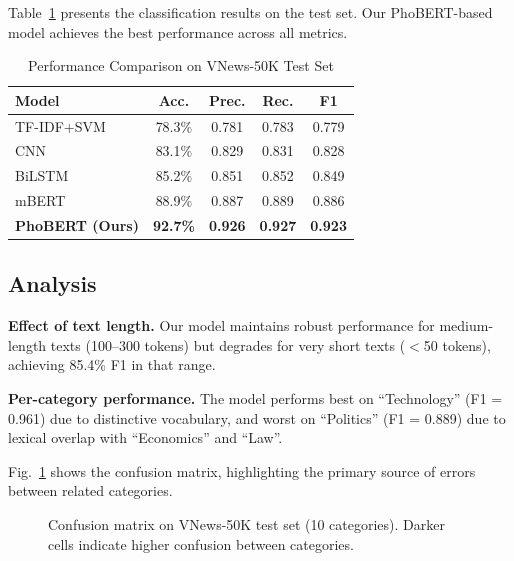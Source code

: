 \documentclass[conference]{IEEEtran}
\begin{document}
Table~\ref{tab:main_results} presents the classification results on
the test set. Our PhoBERT-based model achieves the best performance
across all metrics.

\begin{table}[htbp]
  \centering
  \caption{Performance Comparison on VNews-50K Test Set}
  \label{tab:main_results}
  \begin{tabular}{lcccc}
    \toprule
    Model      & Acc.   & Prec. & Rec.  & F1    \\
    \midrule
    TF-IDF+SVM & 78.3\% & 0.781 & 0.783 & 0.779 \\
    CNN        & 83.1\% & 0.829 & 0.831 & 0.828 \\
    BiLSTM     & 85.2\% & 0.851 & 0.852 & 0.849 \\
    mBERT      & 88.9\% & 0.887 & 0.889 & 0.886 \\
    \textbf{PhoBERT (Ours)} & \textbf{92.7\%} & \textbf{0.926} & \textbf{0.927} & \textbf{0.923} \\
    \bottomrule
  \end{tabular}
\end{table}

\subsection{Analysis}

\textbf{Effect of text length.} Our model maintains robust performance
for medium-length texts (100--300 tokens) but degrades for very short
texts ($<$50 tokens), achieving 85.4\% F1 in that range.

\textbf{Per-category performance.} The model performs best on
``Technology'' (F1 = 0.961) due to distinctive vocabulary, and
worst on ``Politics'' (F1 = 0.889) due to lexical overlap with
``Economics'' and ``Law''.

Fig.~\ref{fig:confusion} shows the confusion matrix, highlighting
the primary source of errors between related categories.

\begin{figure}[htbp]
  \centering
  \caption{Confusion matrix on VNews-50K test set (10 categories).
           Darker cells indicate higher confusion between categories.}
  \label{fig:confusion}
\end{figure}
\end{document}
